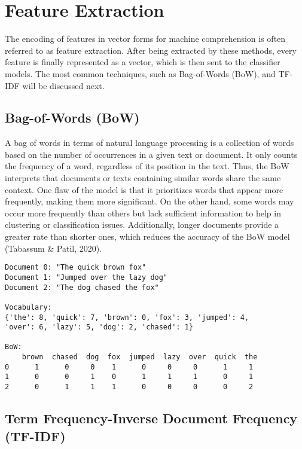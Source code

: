\section{Feature Extraction}

The encoding of features in vector forms for machine comprehension is often referred to as feature extraction. After being extracted by these methods, every feature is finally represented as a vector, which is then sent to the classifier models. The most common techniques, such as Bag-of-Words (BoW), and TF-IDF will be discussed next.

\subsection{Bag-of-Words (BoW)}

A bag of words in terms of natural language processing is a collection of words based on the number of occurrences in a given text or document. It only counts the frequency of a word, regardless of its position in the text. Thus, the BoW interprets that documents or texts containing similar words share the same context. One flaw of the model is that it prioritizes words that appear more frequently, making them more significant. On the other hand, some words may occur more frequently than others but lack sufficient information to help in clustering or classification issues. Additionally, longer documents provide a greater rate than shorter ones, which reduces the accuracy of the BoW model (Tabassum \& Patil, 2020).

\begin{verbatim}
Document 0: "The quick brown fox"
Document 1: "Jumped over the lazy dog"
Document 2: "The dog chased the fox"

Vocabulary: 
{'the': 8, 'quick': 7, 'brown': 0, 'fox': 3, 'jumped': 4,
'over': 6, 'lazy': 5, 'dog': 2, 'chased': 1}

BoW:
    brown  chased  dog  fox  jumped  lazy  over  quick  the
0      1      0     0    1      0     0     0      1     1
1      0      0     1    0      1     1     1      0     1
2      0      1     1    1      0     0     0      0     2
\end{verbatim}


\subsection{Term Frequency-Inverse Document Frequency (TF-IDF)}

